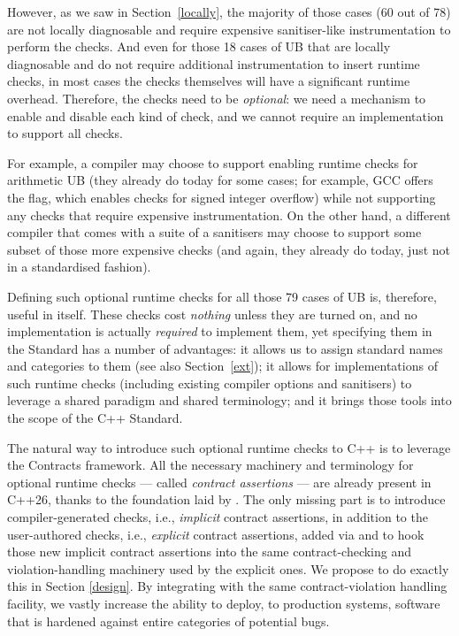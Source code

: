 However, as we saw in Section~\ref{locally}, the majority of those cases (60 out of 78) are not locally diagnosable and require expensive sanitiser-like instrumentation to perform the checks. And even for those 18 cases of UB that are locally diagnosable and do not require additional instrumentation to insert runtime checks, in most cases the checks themselves will have a significant runtime overhead. Therefore, the checks need to be \emph{optional}: we need a mechanism to enable and disable each kind of check, and we cannot require an implementation to support all checks.

For example, a compiler may choose to support enabling runtime checks for arithmetic UB (they already do today for some cases; for example, GCC offers the  flag, which enables checks for signed integer overflow) while not supporting any checks that require expensive instrumentation. On the other hand, a different compiler that comes with a suite of a sanitisers may choose to support some subset of those more expensive checks (and again, they already do today, just not in a standardised fashion).

Defining such optional runtime checks for all those 79 cases of UB is, therefore, useful in itself. These checks cost \emph{nothing} unless they are turned on, and no implementation is actually \emph{required} to implement them, yet specifying them in the Standard has a number of advantages: it allows us to assign standard names and categories to them (see also Section~\ref{ext}); it allows for implementations of such runtime checks (including existing compiler options and sanitisers) to leverage a shared paradigm and shared terminology; and it brings those tools into the scope of the C++ Standard.

The natural way to introduce such optional runtime checks to C++ is to leverage the Contracts framework. All the necessary machinery and terminology for optional runtime checks --- called \emph{contract assertions} --- are already present in C++26, thanks to the foundation laid by \cite{P2900R14}. The only missing part is to introduce compiler-generated checks, i.e., \emph{implicit} contract assertions, in addition to the user-authored checks, i.e., \emph{explicit} contract assertions,  added via \cite{P2900R14} and to hook those new implicit contract assertions into the same contract-checking and violation-handling machinery used by the explicit ones. We propose to do exactly this in Section \ref{design}. By integrating with the same contract-violation handling facility, we vastly increase the ability to deploy, to production systems, software that is hardened against entire categories of potential bugs.

